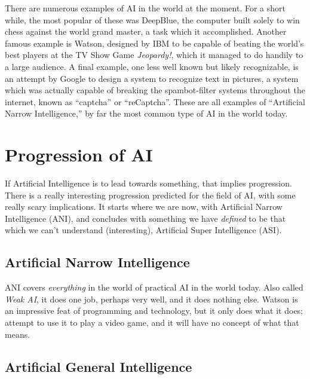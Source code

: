 \documentclass[12pt]{article} %
\begin{document}
There are numerous examples of AI in the world at the moment. For a short while, the most popular of these was DeepBlue, the computer built solely to win chess against the world grand master, a task which it accomplished. Another famous example is Watson, designed by IBM to be capable of beating the world's best players at the TV Show Game \textit{Jeopardy!}, which it managed to do handily to a large audience. A final example, one less well known but likely recognizable, is an attempt by Google to design a system to recognize text in pictures, a system which was actually capable of breaking the spambot-filter systems throughout the internet, known as ``captcha'' or ``reCaptcha''. These are all examples of ``Artificial Narrow Intelligence,'' by far the most common type of AI in the world today.


\section{Progression of AI}

If Artificial Intelligence is to lead towards something, that implies progression. There is a really interesting progression predicted for the field of AI, with some really scary implications. It starts where we are now, with Artificial Narrow Intelligence (ANI), and concludes with something we have \textit{defined} to be that which we can't understand (interesting), Artificial Super Intelligence (ASI).


\subsection{Artificial Narrow Intelligence} %

ANI covers \textit{everything} in the world of practical AI in the world today. Also called \textit{Weak AI}, it does one job, perhaps very well, and it does nothing else. Watson is an impressive feat of programming and technology, but it only does what it does; attempt to use it to play a video game, and it will have no concept of what that means.


\subsection{Artificial General Intelligence} %
\end{document}

